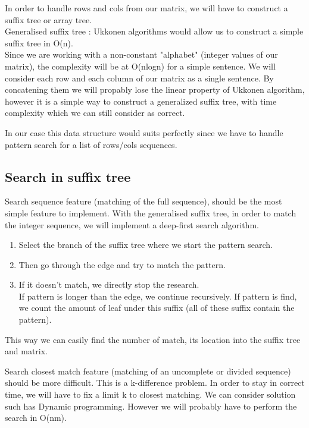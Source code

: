 \par
In order to handle rows and cols from our matrix, we will have to construct a suffix tree or array tree.\\
Generalised suffix tree : Ukkonen algorithms would allow us to construct a simple suffix tree in O(n).\\
Since we are working with a non-constant "alphabet" (integer values of our matrix), the complexity will be at O(nlogn)
for a simple sentence. We will consider each row and each column of our matrix as a single sentence. By concatening them we will propably lose the linear property of Ukkonen algorithm, however it is a simple way to construct a generalized suffix tree, with time complexity which we can still consider as correct.\\

\par
In our case this data structure would suits perfectly since we have to handle pattern search for a list of rows/cols sequences.

\subsection{Search in suffix tree}

\par
Search sequence feature (matching of the full sequence), should be the most simple feature to implement.
With the generalised suffix tree, in order to match the integer sequence, we will implement a deep-first search algorithm.
\begin{enumerate}
	\item Select the branch of the suffix tree where we start the pattern search.
	\item Then go through the edge and try to match the pattern.
	\item If it doesn't match, we directly stop the research.\\
	If pattern is longer than the edge, we continue recursively.
	If pattern is find, we count the amount of leaf under this suffix (all of these suffix contain the pattern).
\end{enumerate}
This way we can easily find the number of match, its location into the suffix tree and matrix.
\bigskip

\par
Search closest match feature (matching of an uncomplete or divided sequence) should be more difficult. This is a k-difference problem. In order to stay in correct time, we will have to fix a limit k to closest matching.
We can consider solution such has Dynamic programming. However we will probably have to perform the search in O(nm).

